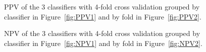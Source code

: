 \documentclass[a4paper,11pt]{article}
\begin{document}
\begin{figure}[!hb]
	\centering
	\caption{PPV of the 3 classifiers with 4-fold cross validation grouped by classifier in Figure~\ref{fig:PPV1} and by fold in Figure~\ref{fig:PPV2}.}
	\label{fig:RealPPV}
\end{figure}

\begin{figure}
	\centering
	\caption{NPV of the 3 classifiers with 4-fold cross validation grouped by classifier in Figure~\ref{fig:NPV1} and by fold in Figure~\ref{fig:NPV2}.}
	\label{fig:RealNPV}
\end{figure}
\end{document}
